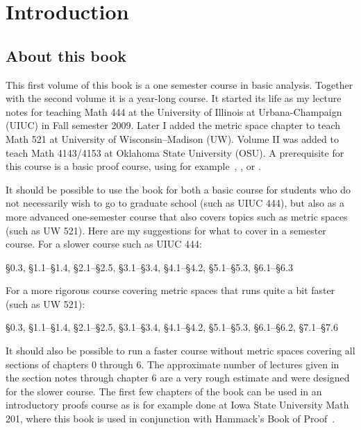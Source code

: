 \chapter*{Introduction}


\section{About this book}

This first volume of this book is a one semester course in basic analysis.
Together with the second volume it is a year-long course.
It started its life
as my lecture notes for teaching Math 444 at the
University of Illinois at Urbana-Champaign (UIUC) in Fall semester 2009.
Later I added the metric space chapter to teach Math 521 at University of
Wisconsin--Madison (UW).
Volume II was added to teach Math 4143/4153 at Oklahoma State University
(OSU).
A prerequisite for this course is a basic proof course,
using 
for example~\cite{Hammack}, \cite{GIAM}, or \cite{DW}.

It should be possible to use the book for
both a basic course for students who do not necessarily wish to
go to graduate school (such as UIUC 444), but also as a more advanced one-semester
course that also covers topics such as metric spaces (such as UW 521).
Here are my suggestions for what to cover in a semester course.  For a
slower course such as UIUC 444:
\begin{center}
\S0.3, \S1.1--\S1.4, \S2.1--\S2.5, \S3.1--\S3.4, \S4.1--\S4.2,
\S5.1--\S5.3, \S6.1--\S6.3
\end{center}
For a more rigorous course covering metric spaces that runs quite a bit faster
(such as UW 521):
\begin{center}
\S0.3, \S1.1--\S1.4, \S2.1--\S2.5, \S3.1--\S3.4, \S4.1--\S4.2,
\S5.1--\S5.3, \S6.1--\S6.2, \S7.1--\S7.6
\end{center}
It should also be possible to run a faster course without metric spaces
covering all sections of chapters 0 through 6.  The approximate number of
lectures given in the section notes through chapter 6 are a very rough
estimate and were designed for the slower course.
The first few chapters of the book can be used in an introductory proofs
course as is for example done at Iowa State University Math 201, where 
this book is used in conjunction with Hammack's Book of Proof~\cite{Hammack}.

